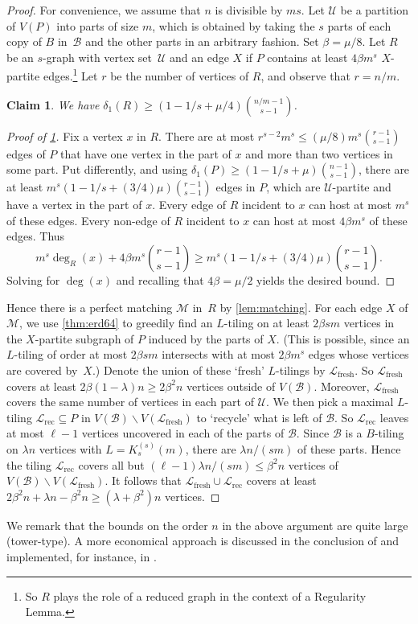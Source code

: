 \documentclass[12pt,reqno]{amsart}
\theoremstyle{plain}
\newtheorem{claim}[theorem]{Claim}
\theoremstyle{definition}
\numberwithin{equation}{section}
\renewcommand{\geq}{\geqslant}
\renewcommand{\leq}{\leqslant}
\renewcommand{\setminus}{\smallsetminus}
\renewcommand{\subset}{\subseteq}
\newcommand{\cB}{\mathcal{B}}
\newcommand{\cL}{\mathcal{L}}
\newcommand{\cM}{\mathcal{M}}
\newcommand{\cU}{\mathcal{U}}
\begin{document}
	\begin{proof}
		For convenience, we assume that $n$ is divisible by $ms$.
		Let $\cU$ be a   partition of $V(P)$ into parts of size $m$, which is obtained by taking the $s$ parts of each copy of $B$ in~$\cB$ and the other parts in an arbitrary fashion.
		Set $\beta = \mu/8$.
		Let $R$ be an $s$-graph with vertex set~$\cU$ and an edge $X$ if $P$ contains at least $4\beta m^{s}$ $X$-partite edges.\footnote{So $R$ plays the role of a reduced graph in the context of a Regularity Lemma.}
		Let $r$ be the number of vertices of $R$, and observe that $r = n/m$.
		\begin{claim}\label{cla:reduced}
			We have $\delta_1(R) \geq \left( 1-1/s+\mu/4 \right) \binom{n/m-1}{s-1}$.
		\end{claim}
		\begin{proof}[Proof of \cref{cla:reduced}]
			Fix a vertex $x$ in $R$.
			There are at most $r^{s-2} m^{s} \leq (\mu/8) m^{s} \binom{r-1}{s-1}$ edges of $P$ that have one vertex in the part of $x$ and more than two vertices in some part.
			Put differently, and using $\delta_1(P) \geq \left(1-1/s+ \mu \right) \binom{n-1}{s-1}$, there are at least $m^s (1-1/s+(3/4)\mu) \binom{r-1}{s-1}$ edges in $P$, which are $\cU$-partite and have a vertex in the part of $x$.
			Every edge of $R$ incident to $x$ can host at most $m^{s}$ of these edges.
			Every non-edge of $R$ incident to $x$ can host at most $4\beta m^s$ of these edges.
			Thus $$m^{s} \deg_R(x) + 4\beta m^s \binom{r-1}{s-1}  \geq m^s (1-1/s+(3/4)\mu) \binom{r-1}{s-1}.$$
			Solving for $\deg(x)$ and recalling that $4\beta = \mu/2$ yields the desired bound.
		\end{proof}
		Hence there is a perfect matching $\cM$ in~$R$ by \cref{lem:matching}.
		For each edge $X$ of $\cM$, we use \cref{thm:erd64} to greedily find an $L$-tiling on at least $2\beta sm$ vertices in the $X$-partite subgraph of $P$ induced by the parts of $X$.
		(This is possible, since an $L$-tiling of order at most $2\beta sm$ intersects with at most $2\beta m^s$ edges whose vertices are covered by~$X$.)
		Denote the union of these `fresh' $L$-tilings by $\cL_{\text{fresh}}$.
		So $\cL_{\text{fresh}}$ covers at least $2\beta (1-\lambda)n \geq 2\beta^2 n$ vertices outside of $V(\cB)$.
		Moreover, $\cL_{\text{fresh}}$ covers the same number of vertices in each part of $\cU$.
		We then pick a maximal $L$-tiling $\cL_{\text{rec}} \subset P$ in $V(\cB) \setminus V(\cL_{\text{fresh}})$ to `recycle' what is left of $\cB$.
		So $\cL_{\text{rec}}$ leaves at most $\ell-1$ vertices uncovered in each of the parts of $\cB$.
		Since $\cB$ is a $B$-tiling on $\lambda n$ vertices with $L = K_{s}^{(s)}(m)$, there are $\lambda n/(sm)$ of these parts.
		Hence the tiling $\cL_{\text{rec}}$ covers all but $(\ell-1)\lambda n/(sm) \leq \beta^2 n$ vertices of $V(\cB) \setminus V(\cL_{\text{fresh}})$.
		It follows that $\cL_{\text{fresh}} \cup \cL_{\text{rec}}$ covers at least $2\beta^2 n + \lambda n - \beta^2 n \geq (\lambda + \beta^2) n$ vertices.
	\end{proof}
	
	We remark that the bounds on the order $n$ in the above argument are quite large (tower-type).
	A more economical approach is discussed in the conclusion of \cite{lang2023tiling} and implemented, for instance, in \cite[Lemma~B.3]{langsanhueza2024dirac}.
	
	
	
	
	
\end{document}
